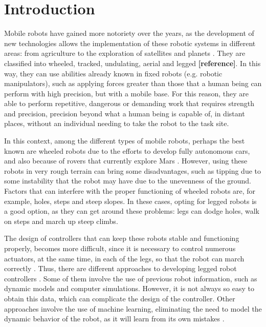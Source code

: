 
\section{Introduction}
Mobile robots have gained more notoriety over the years, as the development of new technologies allows the implementation of these robotic systems in different areas: from agriculture to the exploration of satellites and planets \cite{rong2012configuration, arm2019spacebok}. They are classified into wheeled, tracked, undulating, aerial and legged \textbf{[reference]}. In this way, they can use abilities already known in fixed robots (e.g. robotic manipulators), such as applying forces greater than those that a human being can perform with high precision, but with a mobile base. For this reason, they are able to perform repetitive, dangerous or demanding work that requires strength and precision, precision beyond what a human being is capable of, in distant places, without an individual needing to take the robot to the task site.

In this context, among the different types of mobile robots, perhaps the best known are wheeled robots due to the efforts to develop fully autonomous cars, and also because of rovers that currently explore Mars \cite{maurette2003mars}. However, using these robots in very rough terrain can bring some disadvantages, such as tipping due to some instability that the robot may have due to the unevenness of the ground. Factors that can interfere with the proper functioning of wheeled robots are, for example, holes, steps and steep slopes. In these cases, opting for legged robots is a good option, as they can get around these problems: legs can dodge holes, walk on steps and march up steep climbs.

The design of controllers that can keep these robots stable and functioning properly, becomes more difficult, since it is necessary to control numerous actuators, at the same time, in each of the legs, so that the robot can march correctly \cite{cheetah}. Thus, there are different approaches to developing legged robot controllers \cite{kalakrishnan2010fast, bellicoso2018dynamic, heess2016learning, peng2017deeploco}. Some of them involve the use of previous robot information, such as dynamic models and computer simulations. However, it is not always so easy to obtain this data, which can complicate the design of the controller. Other approaches involve the use of machine learning, eliminating the need to model the dynamic behavior of the robot, as it will learn from its own mistakes \cite{kormushev2013reinforcement}.

